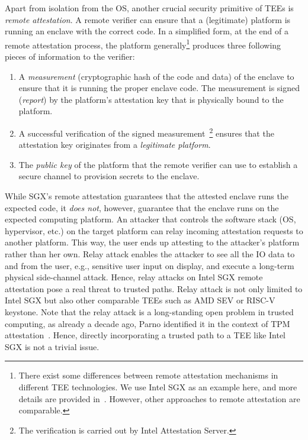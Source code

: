 Apart from isolation from the OS, another crucial security primitive of TEEs is \emph{remote attestation}. A remote verifier can ensure that a (legitimate) platform is running an enclave with the correct code. In a simplified form, at the end of a remote attestation process, the platform generally\footnote{There exist some differences between remote attestation mechanisms in different TEE technologies. We use Intel SGX as an example here, and more details are provided in~. However, other approaches to remote attestation are comparable.} produces three following pieces of information to the verifier: 
\begin {enumerate}
\item A \emph{measurement} (cryptographic hash of the code and data) of the enclave to ensure that it is running the proper enclave code. The measurement is signed (\emph{report}) by the platform's attestation key that is physically bound to the platform. 
\item A successful verification of the signed measurement~\footnote{The verification is carried out by Intel Attestation Server.} ensures that the attestation key originates from a \emph{legitimate platform}.
\item The \emph{public key} of the platform that the remote verifier can use to establish a secure channel to provision secrets to the enclave.
\end{enumerate}

 While SGX's remote attestation guarantees that the attested enclave runs the expected code, it \emph{does not}, however, guarantee that the enclave runs on the expected computing platform. An attacker that controls the software stack (OS, hypervisor, etc.) on the target platform can relay incoming attestation requests to another platform. This way, the user ends up attesting to the attacker's platform rather than her own. Relay attack enables the attacker to see all the IO data to and from the user, e.g., sensitive user input on display, and execute a long-term physical side-channel attack. Hence, relay attacks on Intel SGX remote attestation pose a real threat to trusted paths. Relay attack is not only limited to Intel SGX but also other comparable TEEs such as AMD SEV or RISC-V keystone. Note that the relay attack is a long-standing open problem in trusted computing, as already a decade ago, Parno identified it in the context of TPM attestation~\cite{parno2008bootstrapping}. Hence, directly incorporating a trusted path to a TEE like Intel SGX is not a trivial issue.



